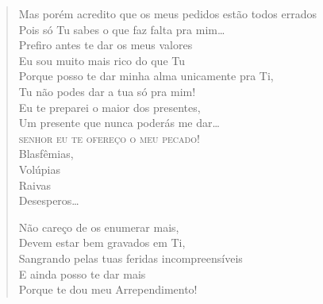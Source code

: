 \begin{verse}
Mas porém acredito que os meus pedidos estão todos errados\\
Pois só Tu sabes o que faz falta pra mim\ldots{}\\
Prefiro antes te dar os meus valores\\
Eu sou muito mais rico do que Tu\\
Porque posso te dar minha alma unicamente pra Ti,\\
Tu não podes dar a tua só pra mim!\\
Eu te preparei o maior dos presentes,\\
Um presente que nunca poderás me dar\ldots{}\\
\textsc{senhor eu te ofereço o meu pecado!}\\
\qquad\qquad\qquad\qquad\qquad\qquad Blasfêmias,\\
\qquad\qquad\qquad\qquad\qquad\qquad Volúpias\\
\qquad\qquad\qquad\qquad\qquad\qquad Raivas\\
\qquad\qquad\qquad\qquad\qquad\qquad Desesperos\ldots{}

Não careço de os enumerar mais,\\
Devem estar bem gravados em Ti,\\
Sangrando pelas tuas feridas incompreensíveis\\
E ainda posso te dar mais\\
Porque te dou meu Arrependimento!


\end{verse}
